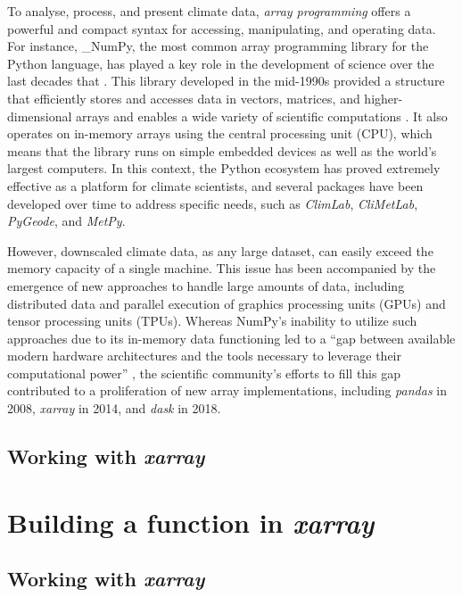 \documentclass[
]{book}
\begin{document}
To analyse, process, and present climate data, \emph{array programming} offers a powerful and compact syntax for accessing, manipulating, and operating data. For instance, \_NumPy, the most common array programming library for the Python language, has played a key role in the development of science over the last decades that \citep{Harris2020}. This library developed in the mid-1990s provided a structure that efficiently stores and accesses data in vectors, matrices, and higher-dimensional arrays and enables a wide variety of scientific computations \citep{vanderWalt2011}. It also operates on in-memory arrays using the central processing unit (CPU), which means that the library runs on simple embedded devices as well as the world's largest computers. In this context, the Python ecosystem has proved extremely effective as a platform for climate scientists, and several packages have been developed over time to address specific needs, such as \emph{ClimLab}, \emph{CliMetLab}, \emph{PyGeode}, and \emph{MetPy}.

However, downscaled climate data, as any large dataset, can easily exceed the memory capacity of a single machine. This issue has been accompanied by the emergence of new approaches to handle large amounts of data, including distributed data and parallel execution of graphics processing units (GPUs) and tensor processing units (TPUs). Whereas NumPy's inability to utilize such approaches due to its in-memory data functioning led to a ``gap between available modern hardware architectures and the tools necessary to leverage their computational power'' \citep{Harris2020}, the scientific community's efforts to fill this gap contributed to a proliferation of new array implementations, including \emph{pandas} in 2008, \emph{xarray} in 2014, and \emph{dask} in 2018.

\hypertarget{working-with-xarray}{%
\section{\texorpdfstring{Working with \emph{xarray}}{Working with xarray}}\label{working-with-xarray}}

\hypertarget{building-a-function-in-xarray}{%
\chapter{\texorpdfstring{Building a function in \emph{xarray}}{Building a function in xarray}}\label{building-a-function-in-xarray}}

\hypertarget{working-with-xarray-1}{%
\section{\texorpdfstring{Working with \emph{xarray}}{Working with xarray}}\label{working-with-xarray-1}}
\end{document}
